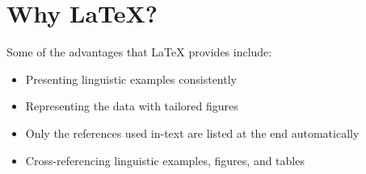 \section{Why {\LaTeX}?}

Some of the advantages that {\LaTeX} provides include:

\begin{itemize}
    \item Presenting linguistic examples consistently
    \item Representing the data with tailored figures 
    \item Only the references used in-text are listed at the end automatically
    \item Cross-referencing linguistic examples, figures, and tables 
\end{itemize}




